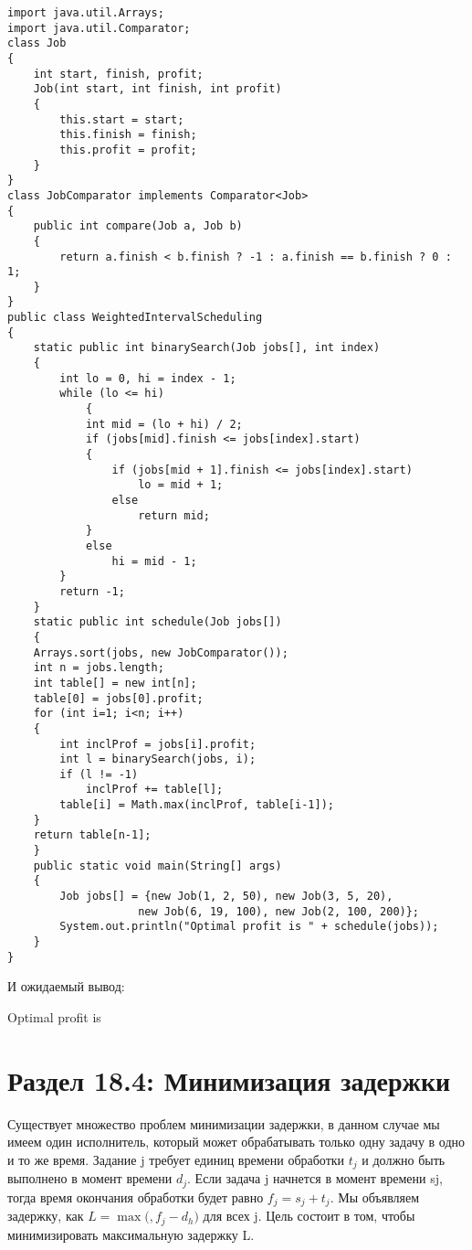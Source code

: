 \vspace{\baselineskip}
\begin{tcolorbox}
\begin{verbatim}
import java.util.Arrays;
import java.util.Comparator;
class Job
{
	int start, finish, profit;
	Job(int start, int finish, int profit)
	{
		this.start = start;
		this.finish = finish;
		this.profit = profit;
	}
}
class JobComparator implements Comparator<Job>
{
	public int compare(Job a, Job b)
	{
		return a.finish < b.finish ? -1 : a.finish == b.finish ? 0 : 1;
	}
}
public class WeightedIntervalScheduling
{
	static public int binarySearch(Job jobs[], int index)
	{
		int lo = 0, hi = index - 1;
		while (lo <= hi)
			{
			int mid = (lo + hi) / 2;
			if (jobs[mid].finish <= jobs[index].start)
			{
				if (jobs[mid + 1].finish <= jobs[index].start)
					lo = mid + 1;
				else
					return mid;
			}
			else
				hi = mid - 1;
		}
		return -1;
	}
	static public int schedule(Job jobs[])
	{
	Arrays.sort(jobs, new JobComparator());
	int n = jobs.length;
	int table[] = new int[n];
	table[0] = jobs[0].profit;
	for (int i=1; i<n; i++)
	{
		int inclProf = jobs[i].profit;
		int l = binarySearch(jobs, i);
		if (l != -1)
			inclProf += table[l];
		table[i] = Math.max(inclProf, table[i-1]);
	}
	return table[n-1];
	}
	public static void main(String[] args)
	{
		Job jobs[] = {new Job(1, 2, 50), new Job(3, 5, 20), 
					new Job(6, 19, 100), new Job(2, 100, 200)};
		System.out.println("Optimal profit is " + schedule(jobs));
	}
}
\end{verbatim}
\end{tcolorbox}

\vspace{\baselineskip}
И ожидаемый вывод:

\vspace{\baselineskip}
\begin{tcolorbox}
    Optimal profit is 
\end{tcolorbox}

\vspace{\baselineskip}
\section*{Раздел 18.4: Минимизация задержки}

\vspace{\baselineskip}
Существует множество проблем минимизации задержки, в данном случае мы имеем один исполнитель, который может обрабатывать только одну задачу в одно и то же время. Задание j требует единиц времени обработки $t_j$ и должно быть выполнено в момент времени $d_j$. Если задача j начнется в момент времени sj, тогда время окончания обработки будет равно $f_j = s_j+t_j$. Мы объявляем задержку, как $L = \max(${\color{Purple}{0}}$, f_j - d_h)$ для всех j. Цель состоит в том, чтобы минимизировать максимальную задержку L.

